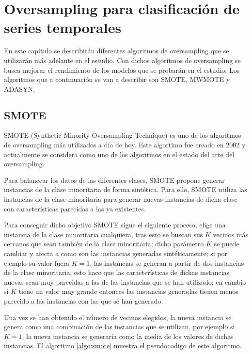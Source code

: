 \chapter{Oversampling para clasificación de series temporales}
En este capítulo se describirán diferentes algoritmos de oversampling que se utilizarán más adelante en el estudio. Con dichos algoritmos de oversampling se busca mejorar el rendimiento de los modelos que se probarán en el estudio. Los algoritmos que a continuación se van a describir son SMOTE, MWMOTE y ADASYN.

\section{SMOTE}
SMOTE (Synthetic Minority Oversampling Technique) \cite{chawla2002smote} es uno de los algoritmos de oversampling más utilizados a día de hoy. Este algortimo fue creado en 2002 y actualmente se considera como uno de los algoritmos en el estado del arte del oversampling.\newline

Para balancear los datos de las diferentes clases, SMOTE propone generar instancias de la clase minoritaria de forma sintética. Para ello, SMOTE utiliza las instancias de la clase minoritaria para generar nuevas instancias de dicha clase con características parecidas a las ya existentes.\newline

Para conseguir dicho objetivo SMOTE sigue el siguiente proceso, elige una instancia de la clase minoritaria cualquiera, tras esto se buscan sus $K$ vecinos más cercanos que sean también de la clase minoritaria; dicho parámetro $K$ se puede cambiar y afecta a como son las instancias generadas sintéticamente; si por ejemplo su valor fuera $K=1$, las instancias se generan a partir de dos instancias de la clase minoritaria, esto hace que las características de dichas instancias nuevas sean muy parecidas a las de las instancias que se han utilizado; en cambio si $K$ tiene un valor muy grande entonces las instancias generadas tienen menos parecido a las instancias con las que se han generado.\newline

Una vez se han obtenido el número de vecinos elegidos, la nueva instancia se genera como una combinación de las instancias que se utilizan, por ejemplo si $K=1$, la nueva instancia se generaría como la media de los valores de dichas instancias. El algoritmo \ref{algo:smote} muestra el pseudocodigo de este algoritmo.\newline

